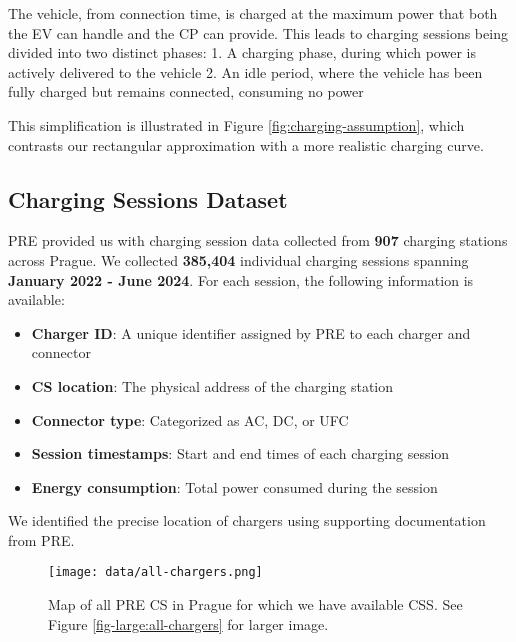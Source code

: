 The vehicle, from connection time, is charged at the maximum power that both the \acrlong{EV} can handle and the \acrlong{CP} can provide. This leads to charging sessions being divided into two distinct phases:
1. A charging phase, during which power is actively delivered to the vehicle
2. An idle period, where the vehicle has been fully charged but remains connected, consuming no power

This simplification is illustrated in Figure \ref{fig:charging-assumption}, which contrasts our rectangular approximation with a more realistic charging curve.

\subsection{Charging Sessions Dataset}

PRE provided us with charging session data collected from \textbf{907} charging stations across Prague. We collected \textbf{385,404} individual charging sessions spanning  \textbf{January 2022 - June 2024}. For each session, the following information is available:

\begin{itemize}
    \item \textbf{Charger ID}: A unique identifier assigned by PRE to each charger and connector
    \item \textbf{\acrlong{CS} location}: The physical address of the charging station
    \item \textbf{Connector type}: Categorized as AC, DC, or UFC
    \item \textbf{Session timestamps}: Start and end times of each charging session
    \item \textbf{Energy consumption}: Total power consumed during the session
\end{itemize}


We identified the precise location of chargers using supporting documentation from PRE.

\begin{figure}[]
    \texttt{[image: data/all-chargers.png]}
    \caption{Map of all PRE \acrlong{CS} in Prague for which we have available \acrlong{CSS}. See Figure \ref{fig-large:all-chargers} for larger image.}
\end{figure}

